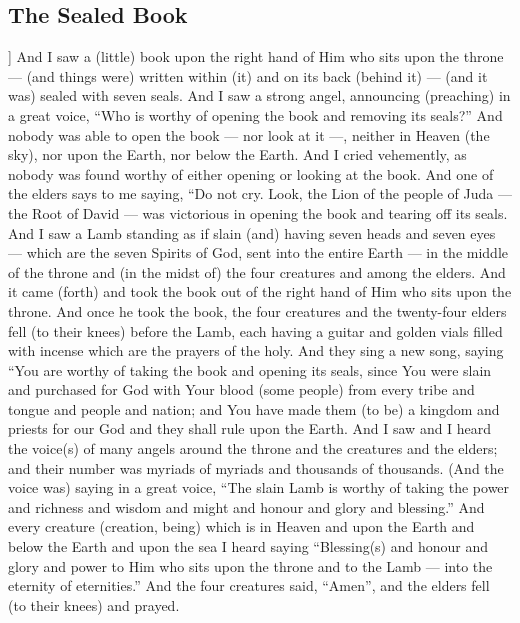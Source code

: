 \begin{pages}
\begin{Leftside}
        			\chapter{The Sealed Book}
				]
		And I saw a (little) book upon the right hand of Him who sits upon the throne — (and things were) written within (it) and on its back (behind it) — (and it was) sealed with seven seals. And I saw a strong angel, announcing (preaching) in a great voice, “Who is worthy of opening the book and removing its seals?” And nobody was able to open the book — nor look at it —, neither in Heaven (the sky), nor upon the Earth, nor below the Earth. And I cried vehemently, as nobody was found worthy of either opening or looking at the book.
		\pend
		\pstart
		And one of the elders says to me saying, “Do not cry. Look, the Lion of the people of Juda — the Root of David — was victorious in opening the book and tearing off its seals. And I saw a Lamb standing as if slain (and) having seven heads and seven eyes — which are the seven Spirits of God, sent into the entire Earth — in the middle of the throne and (in the midst of) the four creatures and among the elders. And it came (forth) and took the book out of the right hand of Him who sits upon the throne.
		\pend
		\pstart
		And once he took the book, the four creatures and the twenty-four elders fell (to their knees) before the Lamb, each having a guitar and golden vials filled with incense which are the prayers of the holy. And they sing a new song, saying “You are worthy of taking the book and opening its seals, since You were slain and purchased for God with Your blood (some people) from every tribe and tongue and people and nation; and You have made them (to be) a kingdom and priests for our God and they shall rule upon the Earth. 
		\pend
		\pstart
		And I saw and I heard the voice(s) of many angels around the throne and the creatures and the elders; and their number was myriads of myriads and thousands of thousands. (And the voice was) saying in a great voice, “The slain Lamb is worthy of taking the power and richness and wisdom and might and honour and glory and blessing.” And every creature (creation, being) which is in Heaven and upon the Earth and below the Earth and upon the sea I heard saying “Blessing(s) and honour and glory and power to Him who sits upon the throne and to the Lamb — into the eternity of eternities.” And the four creatures said, “Amen”, and the elders fell (to their knees) and prayed.
		\pend
        \endnumbering
    \end{Leftside}

\end{pages} 
\Pages


